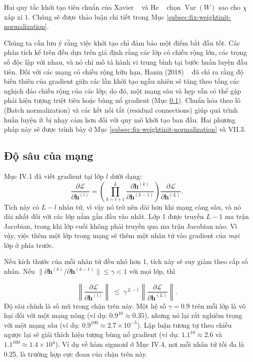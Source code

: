\documentclass[12pt]{article}
\begin{document}
Hai quy tắc khởi tạo tiêu chuẩn của Xavier ~\cite{glorot2010} và He ~\cite{he2015rectifiers} chọn $\operatorname{Var}(W)$ sao cho $\chi$ xấp xỉ $1$. Chúng sẽ được thảo luận chi tiết trong Mục \ref{subsec:fix-weightinit-normalization}.

Chúng ta cần lưu ý rằng việc khởi tạo chỉ đảm bảo một điểm bắt đầu tốt. Các phân tích kể trên đều dựa trên giả định rằng các lớp có chiều rộng lớn, các trọng số độc lập với nhau, và nó chỉ mô tả hành vi trung bình tại bước huấn luyện đầu tiên. Đối với các mạng có chiều rộng hữu hạn, Hanin (2018) ~\cite{hanin2018} đã chỉ ra rằng độ biến thiên của gradient giữa các lần khởi tạo ngẫu nhiên sẽ tăng theo tổng các nghịch đảo chiều rộng của các lớp; do đó, một mạng sâu và hẹp vẫn có thể gặp phải hiện tượng triệt tiêu hoặc bùng nổ gradient (Mục \ref{subsec:depth}). Chuẩn hóa theo lô (Batch normalization) và các kết nối tắt (residual connections) giúp quá trình huấn luyện ít bị nhạy cảm hơn đối với quy mô khởi tạo ban đầu. Hai phương pháp này sẽ được trình bày ở Mục \ref{subsec:fix-weightinit-normalization} và VII.3.

\subsection{Độ sâu của mạng}
\label{subsec:depth}

Mục IV.1 đã viết gradient tại lớp $l$ dưới dạng:
\[
\frac{\partial \mathcal{L}}{\partial \mathbf{h}^{(l)}}
= \left( \prod_{k=l+1}^{L} \frac{\partial \mathbf{h}^{(k)}}{\partial \mathbf{h}^{(k-1)}} \right) \frac{\partial \mathcal{L}}{\partial \mathbf{h}^{(L)}}.
\]
Tích này có $L - l$ nhân tử, vì vậy nó trở nên dài hơn khi mạng càng sâu, và nó dài nhất đối với các lớp nằm gằn đầu vào nhất.  Lớp 1 được truyền $L - 1$ ma trận Jacobian, trong khi lớp cuối không phải truyền qua ma trận Jacobian nào. Vì vậy, việc thêm một lớp trong mạng sẽ thêm một nhân tử vào gradient của \textit{mọi} lớp ở phía trước.

Nếu kích thước của mỗi nhân tử đều nhỏ hơn 1, tích này sẽ suy giảm theo cấp số nhân. Nếu $\big\| \partial \mathbf{h}^{(k)} / \partial \mathbf{h}^{(k-1)} \big\| \le \gamma < 1$ với mọi lớp, thì

\[
\left\| \frac{\partial \mathcal{L}}{\partial \mathbf{h}^{(l)}} \right\| \;\le\; \gamma^{\,L-l}\, \left\| \frac{\partial \mathcal{L}}{\partial \mathbf{h}^{(L)}} \right\| .
\]
Độ sâu chính là số mũ trong chặn trên này. Một hệ số $\gamma = 0.9$ trên mỗi lớp là vô hại đối với một mạng nông (ví dụ: $0.9^{10} \approx 0.35$), nhưng nó lại rất nghiêm trọng với một mạng sâu (ví dụ: $0.9^{100}\approx 2.7\times10^{-5}$). Lập luận tương tự theo chiều ngược lại sẽ giải thích hiện tượng bùng nổ gradient (ví dụ: $1.1^{10} \approx 2.6$ và $1.1^{100} \approx 1.4 \times 10^4$). Ví dụ về hàm sigmoid ở Mục IV.4, nơi mỗi nhân tử tối đa là 0.25, là trường hợp cực đoan của chặn trên này.
\end{document}
